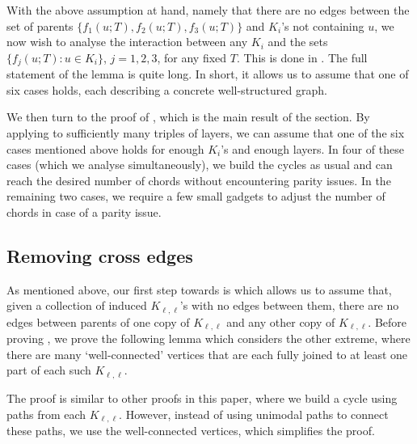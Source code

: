 \documentclass[11pt,english]{article}
\theoremstyle{plain}
\theoremstyle{definition}
\theoremstyle{remark}
\begin{document}
        With the above assumption at hand, namely that there are no edges between the set of parents $\{f_1(u;T), f_2(u;T), f_3(u;T)\}$ and $K_i$'s not containing $u$, we now wish to analyse the interaction between any $K_i$ and the sets $\{f_j(u;T) : u \in K_i\}$, $j = 1, 2, 3$, for any fixed $T$. This is done in . The full statement of the lemma is quite long. In short, it allows us to assume that one of six cases holds, each describing a concrete well-structured graph. 
        
        We then turn to the proof of , which is the main result of the section. By applying  to sufficiently many triples of layers, we can assume that one of the six cases mentioned above holds for enough $K_i$'s and enough layers. In four of these cases (which we analyse simultaneously), we build the cycles as usual and can reach the desired number of chords without encountering parity issues. In the remaining two cases, we require a few small gadgets to adjust the number of chords in case of a parity issue.
        
    \subsection{Removing cross edges}
    
        As mentioned above, our first step towards  is  which allows us to assume that, given a collection of induced $K_{\ell, \ell}$'s with no edges between them, there are no edges between parents of one copy of $K_{\ell, \ell}$ and any other copy of $K_{\ell, \ell}$. Before proving , we prove the following lemma which considers the other extreme, where there are many `well-connected' vertices that are each fully joined to at least one part of each such $K_{\ell, \ell}$. 
        
        The proof is similar to other proofs in this paper, where we build a cycle using paths from each $K_{\ell,\ell}$. However, instead of using unimodal paths to connect these paths, we use the well-connected vertices, which simplifies the proof.
        
\end{document}

